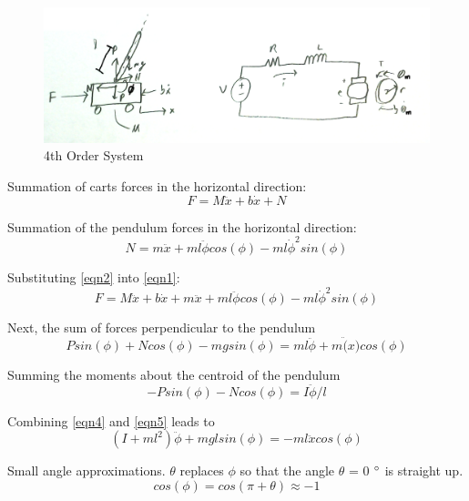 \documentclass{article}
\begin{document}
\begin{figure}[!htb]
\centering
\includegraphics[width=0.95\linewidth]{System4thOrder}
\caption{4th Order System}
\label{fig:4thOrder}
\end{figure}

Summation of carts forces in the horizontal direction:
\begin{equation} 
\label{eqn1}
F = M\ddot{x}+b\dot{x} + N
\end{equation}

Summation of the pendulum forces in the horizontal direction:
\begin{equation} 
\label{eqn2}
N = m\ddot{x}+m l \ddot{\phi} cos(\phi)-m l \dot{\phi}^2sin(\phi)
\end{equation}

Substituting \ref{eqn2} into \ref{eqn1}:
\begin{equation} 
\label{eqn3}
F = M\ddot{x}+b\dot{x} + m\ddot{x}+m l \ddot{\phi} cos(\phi)-m l \dot{\phi}^2sin(\phi)
\end{equation}

Next, the sum of forces perpendicular to the pendulum
\begin{equation} 
\label{eqn4}
Psin(\phi)+Ncos(\phi)-mgsin(\phi) = m l \ddot{\phi} + m\ddot(x)cos(\phi)
\end{equation}

Summing the moments about the centroid of the pendulum
\begin{equation} 
\label{eqn5}
-P sin(\phi)-N cos(\phi) = I \ddot{\phi}/l
\end{equation}

Combining \ref{eqn4} and \ref{eqn5} leads to 
\begin{equation} 
\label{eqn6}
(I+m l^2)\ddot{\phi} + m g lsin(\phi) = -m l \ddot{x} cos(\phi)
\end{equation}

Small angle approximations. $\theta$ replaces $\phi$ so that the angle $\theta$ = 0 $\degree$ is straight up.
\\

\begin{equation} 
\label{sa1}
cos(\phi) = cos(\pi + \theta) \approx -1
\end{equation}
\end{document}

